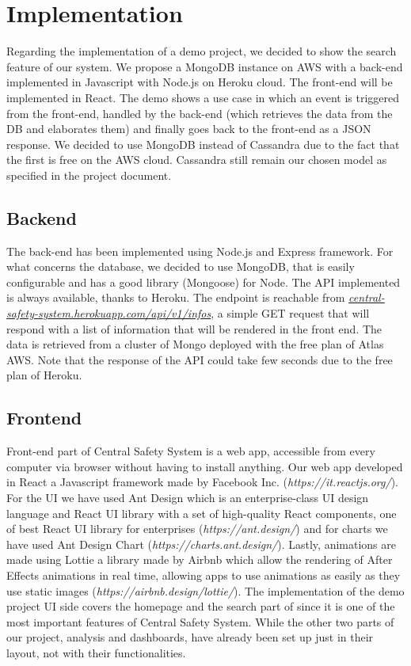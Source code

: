 \documentclass[../main.tex]{subfiles}
\begin{document}
\chapter{Implementation}
Regarding the implementation of a demo project, we decided to show the search feature of our system.
We propose a MongoDB instance on AWS with a back-end implemented in Javascript with Node.js on Heroku cloud. The front-end will be implemented in React.
The demo shows a use case in which an event is triggered from the front-end, handled by the back-end (which retrieves the data from the DB and elaborates them) and finally goes back to the front-end as a JSON response.
We decided to use MongoDB instead of Cassandra due to the fact that the first is free on the AWS cloud. Cassandra still remain our chosen model as specified in the project document.
\section{Backend}
The back-end has been implemented using Node.js and Express framework. For what concerns the database, we decided to use MongoDB, that is easily configurable and has a good library (Mongoose) for Node. The API implemented is always available, thanks to Heroku. The endpoint is reachable from \href{https://central-safety-system.herokuapp.com/api/v1/infos}{\textit{central-safety-system.herokuapp.com/api/v1/infos}}, a simple GET request that will respond with a list of information that will be rendered in the front end. The data is retrieved from a cluster of Mongo deployed with the free plan of Atlas AWS. Note that the response of the API could take few seconds due to the free plan of Heroku.
\section{Frontend}
Front-end part of Central Safety System is a web app, accessible from every computer via browser without having to install anything.
Our web app developed in React a Javascript framework made by Facebook Inc. (\textit{https://it.reactjs.org/}).
For the UI we have used Ant Design which is an enterprise-class UI design language and React UI library with a set of high-quality React components, one of best React UI library for enterprises (\textit{https://ant.design/}) and for charts we have used Ant Design Chart (\textit{https://charts.ant.design/}).
Lastly, animations are made using Lottie a library made by Airbnb which allow the rendering of After Effects animations in real time, allowing apps to use animations as easily as they use static images (\textit{https://airbnb.design/lottie/}).
The implementation of the demo project UI side covers the homepage and the search part of since it is one of the most important features of Central Safety System.
While the other two parts of our project, analysis and dashboards, have already been set up just in their layout, not with their functionalities.
\end{document}

